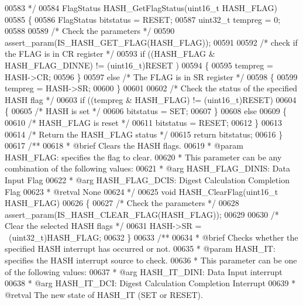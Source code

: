 \begin{DoxyCode}
00583 \textcolor{comment}{  */}
00584 FlagStatus HASH_GetFlagStatus(uint16\_t HASH\_FLAG)
00585 \{
00586   FlagStatus bitstatus = RESET;
00587   uint32\_t tempreg = 0;
00588 
00589   \textcolor{comment}{/* Check the parameters */}
00590   assert_param(IS\_HASH\_GET\_FLAG(HASH\_FLAG));
00591 
00592   \textcolor{comment}{/* check if the FLAG is in CR register */}
00593   \textcolor{keywordflow}{if} ((HASH\_FLAG & HASH_FLAG_DINNE) != (uint16\_t)RESET )
00594   \{
00595     tempreg = HASH->CR;
00596   \}
00597   \textcolor{keywordflow}{else} \textcolor{comment}{/* The FLAG is in SR register */}
00598   \{
00599     tempreg = HASH->SR;
00600   \}
00601 
00602   \textcolor{comment}{/* Check the status of the specified HASH flag */}
00603   \textcolor{keywordflow}{if} ((tempreg & HASH\_FLAG) != (uint16\_t)RESET)
00604   \{
00605     \textcolor{comment}{/* HASH is set */}
00606     bitstatus = SET;
00607   \}
00608   \textcolor{keywordflow}{else}
00609   \{
00610     \textcolor{comment}{/* HASH\_FLAG is reset */}
00611     bitstatus = RESET;
00612   \}
00613 
00614   \textcolor{comment}{/* Return the HASH\_FLAG status */}
00615   \textcolor{keywordflow}{return}  bitstatus;
00616 \}
00617 \textcolor{comment}{/**}
00618 \textcolor{comment}{  * @brief  Clears the HASH flags.}
00619 \textcolor{comment}{  * @param  HASH\_FLAG: specifies the flag to clear. }
00620 \textcolor{comment}{  *          This parameter can be any combination of the following values:}
00621 \textcolor{comment}{  *            @arg HASH\_FLAG\_DINIS: Data Input Flag}
00622 \textcolor{comment}{  *            @arg HASH\_FLAG\_DCIS: Digest Calculation Completion Flag                       }
00623 \textcolor{comment}{  * @retval None}
00624 \textcolor{comment}{  */}
00625 \textcolor{keywordtype}{void} HASH_ClearFlag(uint16\_t HASH\_FLAG)
00626 \{
00627   \textcolor{comment}{/* Check the parameters */}
00628   assert_param(IS\_HASH\_CLEAR\_FLAG(HASH\_FLAG));
00629 
00630   \textcolor{comment}{/* Clear the selected HASH flags */}
00631   HASH->SR = ~(uint32\_t)HASH\_FLAG;
00632 \}
00633 \textcolor{comment}{/**}
00634 \textcolor{comment}{  * @brief  Checks whether the specified HASH interrupt has occurred or not.}
00635 \textcolor{comment}{  * @param  HASH\_IT: specifies the HASH interrupt source to check.}
00636 \textcolor{comment}{  *          This parameter can be one of the following values:}
00637 \textcolor{comment}{  *            @arg HASH\_IT\_DINI: Data Input interrupt}
00638 \textcolor{comment}{  *            @arg HASH\_IT\_DCI: Digest Calculation Completion Interrupt}
00639 \textcolor{comment}{  * @retval The new state of HASH\_IT (SET or RESET).}

\end{DoxyCode}
